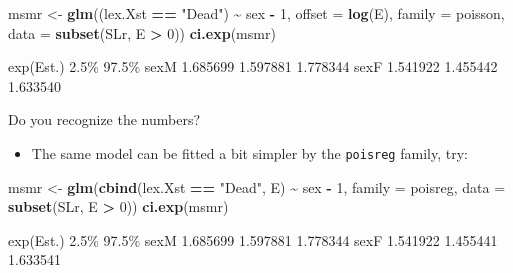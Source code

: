 \documentclass[
]{book}
\newenvironment{Shaded}{\begin{snugshade}}{\end{snugshade}}
\newcommand{\AttributeTok}[1]{\textcolor[rgb]{0.13,0.29,0.53}{#1}}
\newcommand{\DecValTok}[1]{\textcolor[rgb]{0.00,0.00,0.81}{#1}}
\newcommand{\FunctionTok}[1]{\textcolor[rgb]{0.13,0.29,0.53}{\textbf{#1}}}
\newcommand{\NormalTok}[1]{#1}
\newcommand{\OtherTok}[1]{\textcolor[rgb]{0.56,0.35,0.01}{#1}}
\newcommand{\SpecialCharTok}[1]{\textcolor[rgb]{0.81,0.36,0.00}{\textbf{#1}}}
\newcommand{\StringTok}[1]{\textcolor[rgb]{0.31,0.60,0.02}{#1}}
\providecommand{\tightlist}{%
  \setlength{\itemsep}{0pt}\setlength{\parskip}{0pt}}
\begin{document}
\begin{enumerate}
\begin{Shaded}
\begin{Highlighting}[]
\NormalTok{msmr }\OtherTok{\textless{}{-}} \FunctionTok{glm}\NormalTok{((lex.Xst }\SpecialCharTok{==} \StringTok{"Dead"}\NormalTok{) }\SpecialCharTok{\textasciitilde{}}\NormalTok{ sex }\SpecialCharTok{{-}} \DecValTok{1}\NormalTok{,}
            \AttributeTok{offset =} \FunctionTok{log}\NormalTok{(E),}
            \AttributeTok{family =}\NormalTok{ poisson,}
              \AttributeTok{data =} \FunctionTok{subset}\NormalTok{(SLr, E }\SpecialCharTok{\textgreater{}} \DecValTok{0}\NormalTok{))}
\FunctionTok{ci.exp}\NormalTok{(msmr)}
\end{Highlighting}
\end{Shaded}

\begin{Shaded}
\begin{Highlighting}[]
\NormalTok{     exp(Est.)     2.5\%    97.5\%}
\NormalTok{sexM  1.685699 1.597881 1.778344}
\NormalTok{sexF  1.541922 1.455442 1.633540}
\end{Highlighting}
\end{Shaded}

  Do you recognize the numbers?

  \begin{itemize}
  \tightlist
  \item
    The same model can be fitted a bit simpler by the \texttt{poisreg} family, try:
  \end{itemize}

\begin{Shaded}
\begin{Highlighting}[]
\NormalTok{msmr }\OtherTok{\textless{}{-}} \FunctionTok{glm}\NormalTok{(}\FunctionTok{cbind}\NormalTok{(lex.Xst }\SpecialCharTok{==} \StringTok{"Dead"}\NormalTok{, E) }\SpecialCharTok{\textasciitilde{}}\NormalTok{ sex }\SpecialCharTok{{-}} \DecValTok{1}\NormalTok{, }
            \AttributeTok{family =}\NormalTok{ poisreg,}
              \AttributeTok{data =} \FunctionTok{subset}\NormalTok{(SLr, E }\SpecialCharTok{\textgreater{}} \DecValTok{0}\NormalTok{))}
\FunctionTok{ci.exp}\NormalTok{(msmr)}
\end{Highlighting}
\end{Shaded}

\begin{Shaded}
\begin{Highlighting}[]
\NormalTok{     exp(Est.)     2.5\%    97.5\%}
\NormalTok{sexM  1.685699 1.597881 1.778344}
\NormalTok{sexF  1.541922 1.455441 1.633541}
\end{Highlighting}
\end{Shaded}


\end{enumerate}
\end{document}
